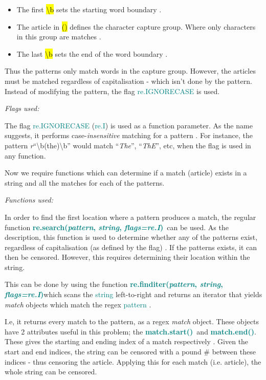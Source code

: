 \documentclass[a4paper]{article}
\newcommand \search {\textcolor{teal}{\textbf{re.search(\emph{pattern}, \emph{string}, \emph{flags=re.I})}}}
\newcommand \finditer {\textcolor{teal}{\textbf{re.finditer(\emph{pattern}, \emph{string}, \emph{flags=re.I})}}}
\newcommand \matchStart {\textcolor{teal}{\textbf{match.start()}}}
\newcommand \matchEnd {\textcolor{teal}{\textbf{match.end()}}}
\begin{document}
\begin{itemize}
    \item The first \hl{\textbackslash b} sets the starting word boundary \autocite{a2022_re}.
    \item The article in \hl{()} defines the character capture group. Where only characters in this group are matches \autocite{a2022_re}.
    \item The last \hl{\textbackslash b} sets the end of the word boundary \autocite{a2022_re}.
\end{itemize}
Thus the patterns only match words in the capture group. However, the articles must be matched regardless of capitalisation - which isn't done by the pattern. Instead of modifying the pattern, the flag \textcolor{teal}{re.IGNORECASE} is used.
\vspace{5mm}


\noindent
\emph{Flags used:}
\vspace{2mm}

\noindent
The flag \textcolor{teal}{re.IGNORECASE} (\textcolor{teal}{re.I}) is used as a function parameter. As the name suggests, it performs case-\emph{insensitive} matching for a pattern \autocite{a2022_re}. For instance, the pattern \emph{r}\enquote{\textbackslash b(the)\textbackslash b} would match \enquote{\emph{The}}, \enquote{\emph{ThE}}, etc, when the flag is used in any function.

Now we require functions which can determine if a match (article) exists in a string and all the matches for each of the patterns.
\vspace{5mm}

\noindent
\emph{Functions used:}
\vspace{2mm}

\noindent
In order to find the first location where a pattern produces a match, the regular function \search \ can be used. As the description, this function is used to determine whether any of the patterns exist, regardless of capitalisation (as defined by the flag) \autocite{a2022_re}. If the patterns exists, it can then be censored. However, this requires determining their location within the string.
\vspace{2mm}

\noindent
This can be done by using the function \finditer which scans the \textcolor{teal}{string} left-to-right and returns an iterator that yields \emph{match} objects which match the regex \textcolor{teal}{pattern} \autocite{a2022_re}.

I.e, it returns every match to the pattern, as a regex \emph{match} object. These objects have 2 attributes useful in this problem; the \matchStart \ and \matchEnd. These gives the starting and ending index of a match respectively \autocite{a2022_re}. Given the start and end indices, the string can be censored with a pound \# between these indices - thus censoring the article. Applying this for each match (i.e. article), the whole string can be censored.
\end{document}
